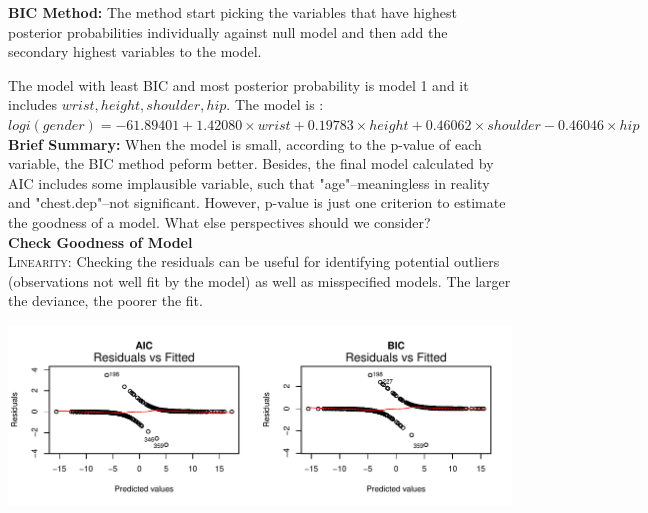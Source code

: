 \documentclass[11pt]{article}\usepackage[]{graphicx}\usepackage[]{color}
\makeatletter
\def\maxwidth{ %
  \ifdim\Gin@nat@width>\linewidth
    \linewidth
  \else
    \Gin@nat@width
  \fi
}
\newenvironment{knitrout}{}{} %
\makeatother
\begin{document}
\textbf{BIC Method:} The method start picking the variables that have highest posterior probabilities individually against null model and then add the secondary highest variables to the model.
\begin{table}[ht]
\centering
{}
\end{table}

The model with least BIC and most posterior probability is model 1 and it includes $wrist, height, shoulder, hip$. The model is : $logi(gender)=-61.89401 + 1.42080\times wrist+ 0.19783\times height+0.46062\times shoulder-0.46046\times hip$\\

\textbf{Brief Summary:} When the model is small, according to the p-value of each variable, the BIC method peform better. Besides, the final model calculated by AIC includes some implausible variable, such that "age"--meaningless in reality and "chest.dep"--not significant. However, p-value is just one criterion to estimate the goodness of a model. What else perspectives should we consider?\\

\textbf{Check Goodness of Model}\\
\textsc{Linearity:} Checking the residuals can be useful for identifying potential outliers (observations not well fit by the model) as well as misspecified models. The larger the deviance, the poorer the fit.



\begin{knitrout}
\color{fgcolor}
\includegraphics[width=\maxwidth]{figure/model_check} 

\end{knitrout}
\end{document}
